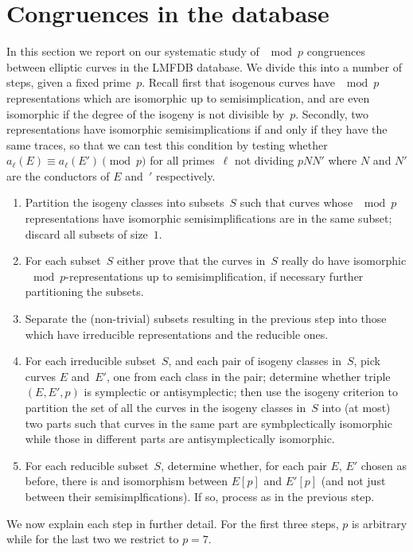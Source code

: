 \documentclass[12pt]{amsart}
\numberwithin{equation}{section}
\theoremstyle{definition}
\theoremstyle{remark}
\begin{document}
\section{Congruences in the database}\label{S:statistics}

In this section we report on our systematic study of $\mod{p}$
congruences between elliptic curves in the LMFDB database.  We divide
this into a number of steps, given a fixed prime~$p$. Recall first
that isogenous curves have $\mod{p}$ representations which are
isomorphic up to semisimplication, and are even isomorphic if the
degree of the isogeny is not divisible by~$p$.  Secondly, two
representations have isomorphic semisimplications if and only if they
have the same traces, so that we can test this condition by testing
whether $a_{\ell}(E)\equiv a_{\ell}(E')\pmod{p}$ for all primes~$\ell$
not dividing $pNN'$ where $N$ and $N'$ are the conductors of $E$
and~$'$ respectively.
\begin{enumerate}
\item Partition the isogeny classes into subsets~$S$ such that curves
  whose $\mod{p}$ representations have isomorphic semisimplifications
  are in the same subset; discard all subsets of size~$1$.
\item For each subset~$S$ either prove that the curves in~$S$ really
  do have isomorphic $\mod{p}$-representations up to
  semisimplification, if necessary further partitioning the subsets.
\item Separate the (non-trivial) subsets resulting in the previous
  step into those which have irreducible representations and the
  reducible ones.
\item For each irreducible subset~$S$, and each pair of isogeny
  classes in~$S$, pick curves $E$ and~$E'$, one from each class in the
  pair; determine whether triple~$(E,E',p)$ is symplectic or
  antisymplectic; then use the isogeny criterion to partition the set
  of all the curves in the isogeny classes in~$S$ into (at most) two
  parts such that curves in the same part are symbplectically
  isomorphic while those in different parts are antisymplectically
  isomorphic.
\item For each reducible subset~$S$, determine whether, for each pair
  $E$, $E'$ chosen as before, there is and isomorphism between $E[p]$
  and $E'[p]$ (and not just between their semisimplfications).  If so,
  process as in the previous step.
\end{enumerate}
We now explain each step in further detail.  For the first three
steps, $p$ is arbitrary while for the last two we restrict to $p=7$.
\end{document}

